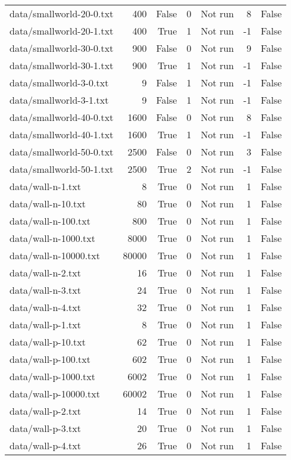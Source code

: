 \begin{tabular}{lrrrrrr}
data/smallworld-20-0.txt & 400 & False & 0 & Not run & 8 & False \\
data/smallworld-20-1.txt & 400 & True & 1 & Not run & -1 & False \\
data/smallworld-30-0.txt & 900 & False & 0 & Not run & 9 & False \\
data/smallworld-30-1.txt & 900 & True & 1 & Not run & -1 & False \\
data/smallworld-3-0.txt & 9 & False & 1 & Not run & -1 & False \\
data/smallworld-3-1.txt & 9 & False & 1 & Not run & -1 & False \\
data/smallworld-40-0.txt & 1600 & False & 0 & Not run & 8 & False \\
data/smallworld-40-1.txt & 1600 & True & 1 & Not run & -1 & False \\
data/smallworld-50-0.txt & 2500 & False & 0 & Not run & 3 & False \\
data/smallworld-50-1.txt & 2500 & True & 2 & Not run & -1 & False \\
data/wall-n-1.txt & 8 & True & 0 & Not run & 1 & False \\
data/wall-n-10.txt & 80 & True & 0 & Not run & 1 & False \\
data/wall-n-100.txt & 800 & True & 0 & Not run & 1 & False \\
data/wall-n-1000.txt & 8000 & True & 0 & Not run & 1 & False \\
data/wall-n-10000.txt & 80000 & True & 0 & Not run & 1 & False \\
data/wall-n-2.txt & 16 & True & 0 & Not run & 1 & False \\
data/wall-n-3.txt & 24 & True & 0 & Not run & 1 & False \\
data/wall-n-4.txt & 32 & True & 0 & Not run & 1 & False \\
data/wall-p-1.txt & 8 & True & 0 & Not run & 1 & False \\
data/wall-p-10.txt & 62 & True & 0 & Not run & 1 & False \\
data/wall-p-100.txt & 602 & True & 0 & Not run & 1 & False \\
data/wall-p-1000.txt & 6002 & True & 0 & Not run & 1 & False \\
data/wall-p-10000.txt & 60002 & True & 0 & Not run & 1 & False \\
data/wall-p-2.txt & 14 & True & 0 & Not run & 1 & False \\
data/wall-p-3.txt & 20 & True & 0 & Not run & 1 & False \\
data/wall-p-4.txt & 26 & True & 0 & Not run & 1 & False \\

\end{tabular}
